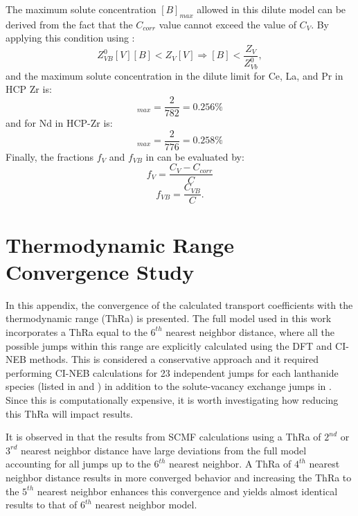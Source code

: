 \documentclass[preprint,12pt]{elsarticle}
\begin{document}
The maximum solute concentration $[B]_{max}$ allowed in this dilute model can be derived from the fact that the $C_{corr}$ value cannot exceed the value of $C_V$. By applying this condition using :
\begin{equation}
    Z_{VB}^0 [V] [B] < Z_V [V] \Longrightarrow [B] < \frac{Z_V}{Z_{Vb}^0},
\end{equation}
and the maximum solute concentration in the dilute limit for Ce, La, and Pr in HCP Zr is:
\begin{equation}
        [B]_{max} = \frac{2}{782} = 0.256\%
\end{equation}
and for Nd in HCP-Zr is:
\begin{equation}
        [B]_{max} = \frac{2}{776} = 0.258\%
\end{equation}
Finally, the fractions $f_V$ and $f_{VB}$ in  can be evaluated by:
\begin{equation}
    f_V = \frac{C_V - C_{corr}}{C}
\end{equation}
\begin{equation}
    f_{VB} = \frac{C_{VB}}{C}.
\end{equation}

\FloatBarrier

\section{Thermodynamic Range Convergence Study}
\label{appendix_conv_th_ra}


In this appendix, the convergence of the calculated transport coefficients with the thermodynamic range (ThRa) is presented. The full model used in this work incorporates a ThRa equal to the $6^{th}$ nearest neighbor distance, where all the possible jumps within this range are explicitly calculated using the DFT and CI-NEB methods. This is considered a conservative approach and it required performing CI-NEB calculations for 23 independent jumps for each lanthanide species (listed in  and ) in addition to the solute-vacancy exchange jumps in . Since this is computationally expensive, it is worth investigating how reducing this ThRa will impact results.

It is observed in  that the results from SCMF calculations using a ThRa of $2^{nd}$ or $3^{rd}$ nearest neighbor distance have large deviations from the full model accounting for all jumps up to the $6^{th}$ nearest neighbor. A ThRa of $4^{th}$ nearest neighbor distance results in more converged behavior and increasing the ThRa to the $5^{th}$ nearest neighbor enhances this convergence and yields almost identical results to that of $6^{th}$ nearest neighbor model.
\end{document}
